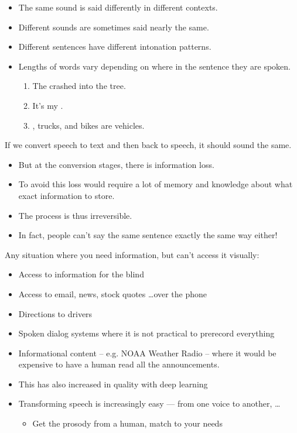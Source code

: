 \documentclass[a4paper,landscape,headrule,footrule,xetex]{foils}
\begin{document}
\begin{itemize}
\item The same sound is said differently in different contexts.
\item Different sounds are sometimes said nearly the same.
\item Different sentences have different intonation patterns. 
\item Lengths of words vary depending on where in the sentence they are spoken. 
    \begin{enumerate}
    \item The  crashed into the tree.
    \item It's my .
    \item {}, trucks, and bikes are vehicles.
    \end{enumerate}
  \end{itemize}







If we convert speech to text and then back to speech, it should sound the same.
\begin{itemize}
\item  But at the conversion stages, there is information loss.
\item To avoid this loss would require a lot of memory and knowledge about what exact information to store.
\item The process is thus irreversible.
\item In fact, people can't say the same sentence exactly the same way either!
\end{itemize}

Any situation where you need information, but can't access it visually:

\begin{itemize}
\item Access to information for the blind
\item Access to email, news, stock quotes \ldots over the phone
\item Directions to drivers
\item Spoken dialog systems where it is not practical to prerecord everything
\item Informational content – e.g. NOAA Weather Radio – where it would be expensive to have a human read all the announcements.
\item This has also increased in quality with deep learning
\item Transforming speech is increasingly easy --- from one voice to another, \ldots
  \begin{itemize}
  \item Get the prosody from a human, match to your needs
  \end{itemize}
\end{itemize}
\end{document}
